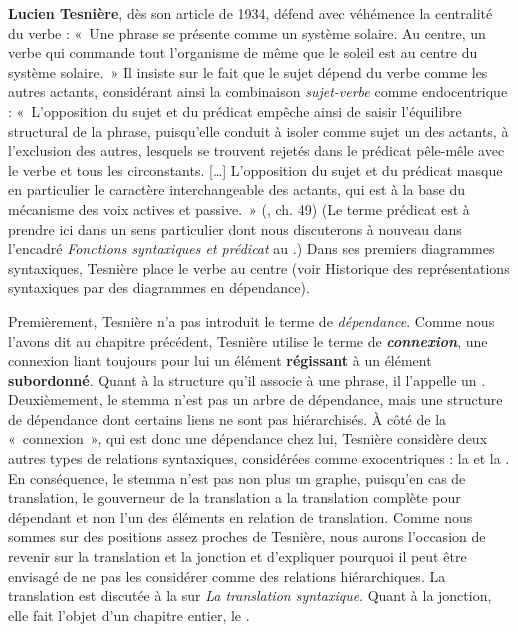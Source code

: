 {    \textbf{Lucien Tesnière}, dès son article de 1934, défend avec véhémence la centralité du verbe : «~Une phrase se présente comme un système solaire. Au centre, un verbe qui commande tout l’organisme de même que le soleil est au centre du système solaire.~» Il insiste sur le fait que le sujet dépend du verbe comme les autres actants, considérant ainsi la combinaison \textit{sujet-verbe} comme endocentrique : «~L’opposition du sujet et du prédicat empêche ainsi de saisir l’équilibre structural de la phrase, puisqu’elle conduit à isoler comme sujet un des actants, à l’exclusion des autres, lesquels se trouvent rejetés dans le prédicat pêle-mêle avec le verbe et tous les circonstants. […] L’opposition du sujet et du prédicat masque en particulier le caractère interchangeable des actants, qui est à la base du mécanisme des voix actives et passive.~» (\citeyear{Tesnières1959}, ch. 49) (Le terme prédicat est à prendre ici dans un sens particulier dont nous discuterons à nouveau dans l’encadré \textit{Fonctions syntaxiques et prédicat} au .) Dans ses premiers diagrammes syntaxiques, Tesnière place le verbe au centre (voir  Historique des représentations syntaxiques par des diagrammes en dépendance).

    Premièrement, Tesnière n’a pas introduit le terme de \textit{dépendance}. Comme nous l’avons dit au chapitre précédent, Tesnière utilise le terme de \textbf{\textit{connexion}}, une connexion liant toujours pour lui un élément \textbf{régissant} à un élément \textbf{subordonné}. Quant à la structure qu’il associe à une phrase, il l’appelle un . Deuxièmement, le stemma n’est pas un arbre de dépendance, mais une structure de dépendance dont certains liens ne sont pas hiérarchisés. À côté de la «~connexion~», qui est donc une dépendance chez lui, Tesnière considère deux autres types de relations syntaxiques, considérées comme exocentriques : la  et la . En conséquence, le stemma n’est pas non plus un graphe, puisqu’en cas de translation, le gouverneur de la translation a la translation complète pour dépendant et non l’un des éléments en relation de translation. Comme nous sommes sur des positions assez proches de Tesnière, nous aurons l’occasion de revenir sur la translation et la jonction et d’expliquer pourquoi il peut être envisagé de ne pas les considérer comme des relations hiérarchiques. La translation est discutée à la  sur \textit{La translation syntaxique}. Quant à la jonction, elle fait l’objet d’un chapitre entier, le .

}
